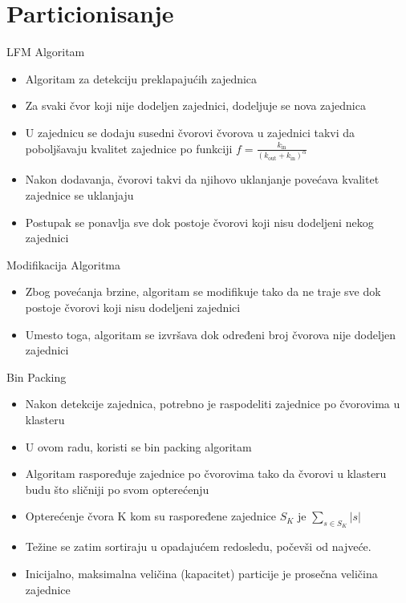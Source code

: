 \documentclass{beamer}
\begin{document}
\section{Particionisanje}
\begin{frame}{LFM Algoritam}
    \begin{itemize}
        \item Algoritam za detekciju preklapajućih zajednica 
        \item Za svaki čvor koji nije dodeljen zajednici, dodeljuje se nova zajednica 
        \item U zajednicu se dodaju susedni čvorovi čvorova u zajednici takvi da poboljšavaju kvalitet zajednice po funkciji $ f = \frac{k_\text{in}}{(k_\text{out} + k_\text{in})^\alpha} $ 
        \item Nakon dodavanja, čvorovi takvi da njihovo uklanjanje povećava kvalitet zajednice se uklanjaju
        \item Postupak se ponavlja sve dok postoje čvorovi koji nisu dodeljeni nekog zajednici
    \end{itemize}
\end{frame}

\begin{frame}{Modifikacija Algoritma}
    \begin{itemize}
        \item Zbog povećanja brzine, algoritam se modifikuje tako da ne traje sve dok postoje čvorovi koji nisu dodeljeni zajednici
        \item Umesto toga, algoritam se izvršava dok određeni broj čvorova nije dodeljen zajednici
    \end{itemize}
\end{frame}

\begin{frame}{Bin Packing}
    \begin{itemize}
        \item Nakon detekcije zajednica, potrebno je raspodeliti zajednice po čvorovima u klasteru
        \item U ovom radu, koristi se bin packing algoritam
        \item Algoritam raspoređuje zajednice po čvorovima tako da čvorovi u klasteru budu što sličniji po svom opterećenju
        \item Opterećenje čvora K kom su raspoređene zajednice $ S_K $ je $ \sum_{s \in S_K} |s| $
        \item Težine se zatim sortiraju u opadajućem redosledu, počevši od najveće.
        \item Inicijalno, maksimalna veličina (kapacitet) particije je prosečna veličina zajednice 
    \end{itemize}
\end{frame}
\end{document}
